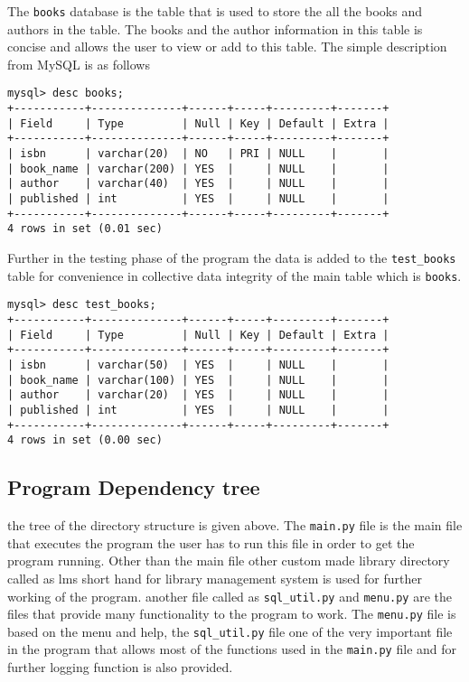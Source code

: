 \documentclass[12pt, a4paper, titlepage, openany]{report}
\begin{document}
The \verb+books+ database is the table that is used to store the all the books and authors in the table. The books and the author information in this table is concise and allows the user to view or add to this table. The simple description from MySQL is as follows
\begin{verbatim}
mysql> desc books;
+-----------+--------------+------+-----+---------+-------+
| Field     | Type         | Null | Key | Default | Extra |
+-----------+--------------+------+-----+---------+-------+
| isbn      | varchar(20)  | NO   | PRI | NULL    |       |
| book_name | varchar(200) | YES  |     | NULL    |       |
| author    | varchar(40)  | YES  |     | NULL    |       |
| published | int          | YES  |     | NULL    |       |
+-----------+--------------+------+-----+---------+-------+
4 rows in set (0.01 sec)

\end{verbatim} 
Further in the testing phase of the program the data is added to the \verb+test_books+ table for convenience in collective data integrity of the main table which is \verb+books+.
\newpage
\begin{verbatim}
mysql> desc test_books;
+-----------+--------------+------+-----+---------+-------+
| Field     | Type         | Null | Key | Default | Extra |
+-----------+--------------+------+-----+---------+-------+
| isbn      | varchar(50)  | YES  |     | NULL    |       |
| book_name | varchar(100) | YES  |     | NULL    |       |
| author    | varchar(20)  | YES  |     | NULL    |       |
| published | int          | YES  |     | NULL    |       |
+-----------+--------------+------+-----+---------+-------+
4 rows in set (0.00 sec)

\end{verbatim}
\newpage

\subsection{Program Dependency tree}

the tree of the directory structure is given above. The \verb+main.py+ file is the main file that executes the program the user has to run this file in order to get the program running. Other than the main file other custom made library directory called as lms short hand for library management system is used for further working of the program. another file called as \verb+sql_util.py+ and \verb+menu.py+ are the files that provide many functionality to the program to work. The \verb+menu.py+ file is based on the menu and help, the \verb+sql_util.py+ file one of the very important file in the program that allows most of the functions used in the \verb+main.py+ file and for further logging function is also provided. 
\end{document}
